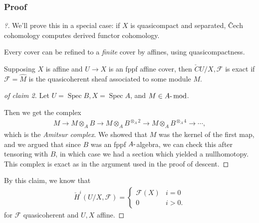 \hypertarget{proof}{%
\subsubsection{Proof}\label{proof}}

\begin{proof}[?]

We'll prove this in a special case: if \(X\) is quasicompact and
separated, Čech cohomology computes derived functor cohomology.

\begin{claim}[1]

Every cover can be refined to a \emph{finite} cover by affines, using
quasicompactness.

\end{claim}

\begin{claim}[2]

Supposing \(X\) is affine and \(U\to X\) is an fppf affine cover, then
\({\check{C}}{U/X, \mathcal{F}}\) is exact if
\(\mathcal{F} = \widehat{M}\) is the quasicoherent sheaf associated to
some module \(M\).

\end{claim}

\begin{proof}[of claim 2]

Let \(U=\operatorname{Spec}B, X = \operatorname{Spec}A\), and
\(M\in {{A}{\hbox{-}}\operatorname{mod}}\).

Then we get the complex
\begin{align*}  
M\to
M\otimes_A B \to 
M\otimes_A B^{\otimes_A 2} \to 
M\otimes_A B^{\otimes_A 4} \to 
\cdots
,\end{align*}
which is the \emph{Amitsur complex}. We showed that \(M\) was the kernel
of the first map, and we argued that since \(B\) was an fppf
\(A{\hbox{-}}\)algebra, we can check this after tensoring with \(B\), in
which case we had a section which yielded a nullhomotopy. This complex
is exact as in the argument used in the proof of descent.

\end{proof}

By this claim, we know that
\begin{align*}  
{\check{H}}^{i}(U/X, \mathcal{F}) = 
\begin{cases}
\mathcal{F}(X) & i = 0 \\
0              & i>0.
\end{cases}
\end{align*}
for \(\mathcal{F}\) quasicoherent and \(U, X\) affine.


\end{proof}
